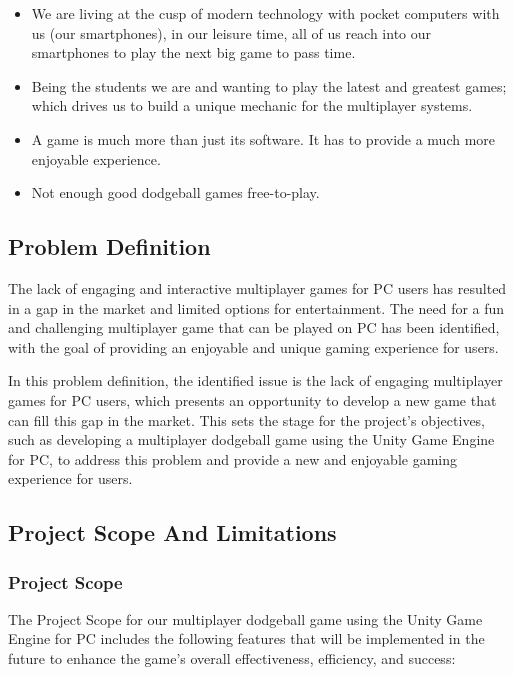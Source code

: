 \documentclass[12pt]{report}
\begin{document}
\justifying
\setlength{\parindent}{4em}
\setlength{\parskip}{0.5em}
\renewcommand{\baselinestretch}{1.5}
\normalsize\hspace{1.7cm}\begin{itemize} \item We are living at the cusp of modern technology with pocket computers with us (our smartphones), in our leisure time, all of us reach into our smartphones to play the next big game to pass time.

\item Being the students we are and wanting to play the latest and greatest games; which drives us to build a unique mechanic for the multiplayer systems.

\item A game is much more than just its software. It has to provide a much more enjoyable experience.

\item Not enough good dodgeball games free-to-play.\\
\end{itemize}
\raggedright
\subsection{Problem Definition}

\justifying
\setlength{\parindent}{4em}
\setlength{\parskip}{0.5em}
\renewcommand{\baselinestretch}{1.5}
\normalsize \hspace{1.7cm} The lack of engaging and interactive multiplayer games for PC users has resulted in a gap in the market and limited options for entertainment. The need for a fun and challenging multiplayer game that can be played on PC has been identified, with the goal of providing an enjoyable and unique gaming experience for users.

In this problem definition, the identified issue is the lack of engaging multiplayer games for PC users, which presents an opportunity to develop a new game that can fill this gap in the market. This sets the stage for the project's objectives, such as developing a multiplayer dodgeball game using the Unity Game Engine for PC, to address this problem and provide a new and enjoyable gaming experience for users.
\clearpage
\raggedright
\subsection{Project Scope And Limitations }
\subsubsection{Project Scope}
\justifying
\setlength{\parindent}{2em}
\setlength{\parskip}{0.5em}
\renewcommand{\baselinestretch}{1.5}
\normalsize \hspace{1.7cm} The Project Scope for our multiplayer dodgeball game using the Unity Game Engine for PC includes the following features that will be implemented in the future to enhance the game's overall effectiveness, efficiency, and success:
\end{document}
